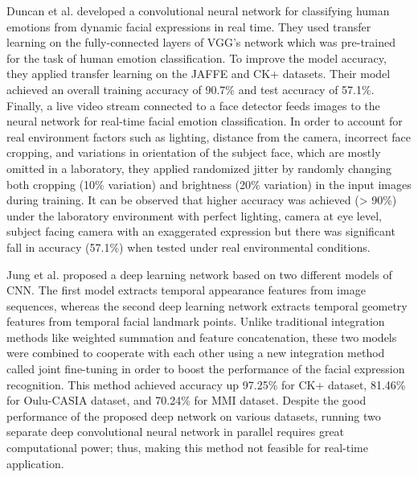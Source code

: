 \documentclass[master]{thesis-uestc}
\begin{document}
Duncan et al.\cite{duncan2016} developed a convolutional neural network for classifying human emotions from dynamic facial expressions in real time. They used transfer learning on the fully-connected layers of VGG's network which was pre-trained for the task of human emotion classification. To improve the model accuracy, they applied transfer learning on the JAFFE\cite{Michael-2017} and CK+ datasets. Their model achieved an overall training accuracy of 90.7\% and test accuracy of 57.1\%. Finally, a live video stream connected to a face detector feeds images to the neural network for real-time facial emotion classification. In order to account for real environment factors such as lighting, distance from the camera, incorrect face cropping, and variations in orientation of the subject face, which are mostly omitted in a laboratory, they applied randomized jitter by randomly changing both cropping (10\% variation) and brightness (20\% variation) in the input images during training. It can be observed that higher accuracy was achieved (> 90\%) under the laboratory environment with perfect lighting, camera at eye level, subject facing camera with an exaggerated expression but there was significant fall in accuracy (57.1\%) when tested under real environmental conditions.

Jung et al.\cite{7410698} proposed a deep learning network based on two different models of CNN. The first model extracts temporal appearance features from image sequences, whereas the second deep learning network extracts temporal geometry features from temporal facial landmark points. Unlike traditional integration methods like weighted summation and feature concatenation, these two models were combined to cooperate with each other using a new integration method called joint fine-tuning in order to boost the performance of the facial expression recognition. This method achieved accuracy up 97.25\% for CK+ dataset, 81.46\% for Oulu-CASIA dataset\cite{ZHAO2011607}, and 70.24\% for MMI dataset\cite{1521424, Valstar10induceddisgust}. Despite the good performance of the proposed deep network on various datasets, running two separate deep convolutional neural network in parallel requires great computational power; thus, making this method not feasible for real-time application.
\end{document}
